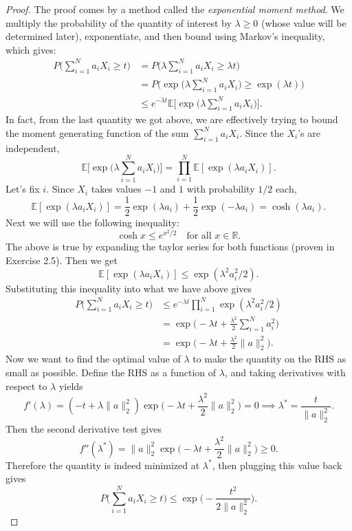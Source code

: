 \begin{proof}
The proof comes by a method called the \textit{exponential moment method}. We multiply the probability of 
the quantity of interest by $\lambda \geq 0$ (whose value will be determined later), exponentiate, 
and then bound using Markov's inequality, which gives: 
\begin{align*}
	P \biggl( \sum_{i = 1}^{N} a_iX_i \geq t \biggr) 
	&= P \biggl( \lambda \sum_{i = 1}^{N} a_iX_i \geq \lambda t \biggr) \\
	&= P \biggl( \exp{\biggl( \lambda \sum_{i = 1}^{N} a_iX_i \biggr)} \geq \exp{(\lambda t)} \biggr) \\
	&\leq e^{-\lambda t} \mathbb{E} \biggl[ \exp{\biggl( \lambda \sum_{i = 1}^{N} a_iX_i \biggr)} \biggr].
\end{align*}
In fact, from the last quantity we got above, we are effectively trying to bound the moment generating 
function of the sum $\sum_{i = 1}^{N} a_iX_i$. Since the $X_i$'s are independent, 
\[ \mathbb{E} \biggl[ \exp{\biggl( \lambda \sum_{i = 1}^{N} a_iX_i \biggr)} \biggr] 
= \prod_{i = 1}^{N} \mathbb{E}[\exp{(\lambda a_i X_i)}]. \]
Let's fix $i$. Since $X_i$ takes values $-1$ and $1$ with probability $1/2$ each, 
\[ \mathbb{E}[\exp{(\lambda a_i X_i)}] = \frac{1}{2}\exp{(\lambda a_i)} 
+ \frac{1}{2}\exp{(-\lambda a_i)} = \cosh{(\lambda a_i)}. \]
Next we will use the following inequality: 
\[ \cosh{x} \leq e^{x^2/2} \quad \text{for all } x \in \mathbb{R}. \]
The above is true by expanding the taylor series for both functions (proven in Exercise 2.5). Then 
we get 
\[ \mathbb{E}[\exp{(\lambda a_i X_i)}] \leq \exp{(\lambda^2 a_i^2 / 2)}. \]
Substituting this inequality into what we have above gives 
\begin{align*}
	P \biggl( \sum_{i = 1}^{N} a_iX_i \geq t \biggr) 
	&\leq e^{-\lambda t} \prod_{i = 1}^{N} \exp{(\lambda^2 a_i^2 / 2)} \\
	&= \exp{\biggl( -\lambda t + \frac{\lambda^2}{2}\sum_{i = 1}^{N} a_i^2 \biggr)} \\
	&= \exp{\biggl( -\lambda t + \frac{\lambda^2}{2} \|a\|_2^2 \biggr)}.
\end{align*}
Now we want to find the optimal value of $\lambda$ to make the quantity on the RHS as small as possible. 
Define the RHS as a function of $\lambda$,  and taking derivatives with respect to $\lambda$ yields
\[ f'(\lambda) = (-t + \lambda \|a\|_2^2) 
\exp{\biggl( -\lambda t + \frac{\lambda^2}{2} \|a\|_2^2 \biggr)} = 0 
\implies \lambda^* = \frac{t}{\|a\|_2^2}. \]
Then the second derivative test gives 
\[ f''(\lambda^*) = \|a\|_2^2 \exp{\biggl( -\lambda t + \frac{\lambda^2}{2} \|a\|_2^2 \biggr)} \geq 0. \]
Therefore the quantity is indeed minimized at $\lambda^*$, then plugging this value back gives 
\[ P \biggl( \sum_{i = 1}^{N} a_iX_i \geq t \biggr) 
\leq \exp{\biggl( -\frac{t^2}{2\|a\|_2^2} \biggr)}. \]
\end{proof}

